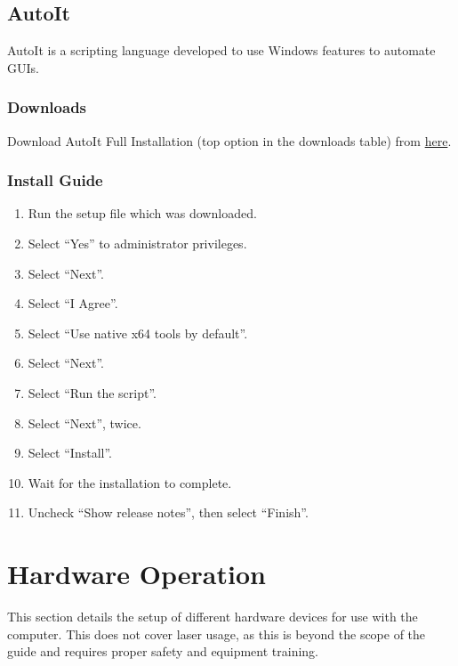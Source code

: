 \documentclass[11pt, letterpaper, titlepage]{article}
\begin{document}
\subsection{AutoIt} \label{autoit} %
AutoIt is a scripting language developed to use Windows features to automate GUIs.
\subsubsection{Downloads} %
Download AutoIt Full Installation (top option in the downloads table) from \href{https://www.autoitscript.com/site/autoit/downloads/}{here}.
\subsubsection{Install Guide} %
\begin{enumerate}
    \item Run the setup file which was downloaded.
    \item Select ``Yes'' to administrator privileges.
    \item Select ``Next''.
    \item Select ``I Agree''.
    \item Select ``Use native x64 tools by default''.
    \item Select ``Next''.
    \item Select ``Run the script''.
    \item Select ``Next'', twice.
    \item Select ``Install''.
    \item Wait for the installation to complete.
    \item Uncheck ``Show release notes'', then select ``Finish''.
\end{enumerate}
\newpage
\section{Hardware Operation} %
This section details the setup of different hardware devices for use with the computer.
This does not cover laser usage, as this is beyond the scope of the guide and requires proper safety and equipment training.
\end{document}
